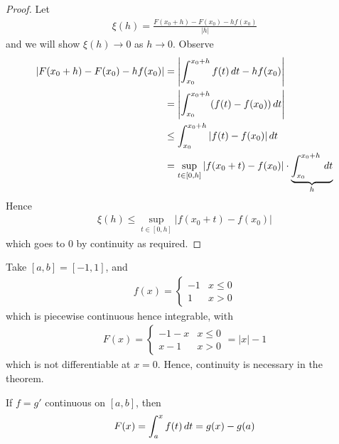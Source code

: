 \documentclass{../../template/note}
\begin{document}
    \begin{proof}
        Let
        \begin{align*}
            \xi(h) = \frac{F(x_0+h)-F(x_0)-hf(x_0)}{|h|}
        \end{align*}
        and we will show \(\xi(h) \to 0\) as \(h \to 0\). Observe
        \begin{align*}
            |F(x_0+h)-F(x_0)-hf(x_0)| &= \left|\int_{x_0}^{x_0+h} f(t) \,d{t} - hf(x_0)\right| \\
            &= \left|\int_{x_0}^{x_0+h} (f(t)-f(x_0)) \,d{t}\right| \\
            &\leq \int_{x_0}^{x_0+h} |f(t)-f(x_0)| \,d{t} \\
            &= \sup_{t \in [0, h]}|f(x_0+t)-f(x_0)| \cdot \underbrace{\int_{x_0}^{x_0+h} \,d{t}}_h
        \end{align*}
        Hence
        \begin{align*}
            \xi(h) \leq \sup_{t \in [0, h]}|f(x_0+t)-f(x_0)|
        \end{align*}
        which goes to 0 by continuity as required. 
    \end{proof}
    
    \begin{example*}
        Take \([a, b] = [-1, 1]\), and
        \begin{align*}
            f(x) = \begin{cases}
                -1 & x \leq 0 \\
                1 & x > 0
            \end{cases}
        \end{align*}
        which is piecewise continuous hence integrable, with
        \begin{align*}
            F(x) = \begin{cases}
                -1-x & x \leq 0 \\
                x-1 & x > 0
            \end{cases} = |x| - 1
        \end{align*}
        which is not differentiable at \(x=0\). Hence, continuity is necessary in the theorem.       
    \end{example*}
    
    \begin{corollary}
        If \(f = g'\) continuous on \([a, b]\), then
        \begin{align*}
            F(x) = \int_a^x f(t) \,d{t} = g(x) - g(a)
        \end{align*}
    \end{corollary}
    
\end{document}
